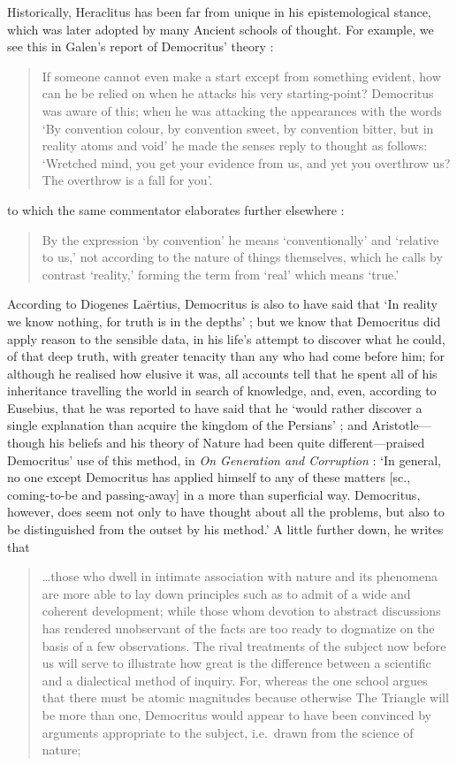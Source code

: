 Historically, Heraclitus has been far from unique in his epistemological stance, which was later adopted by many Ancient schools of thought. For example, we see this in Galen's report of Democritus' theory \cite{Taylor1999}:
\begin{quotation}
If someone cannot even make a start except from something evident, how can he be relied on when he attacks his very starting-point? Democritus was aware of this; when he was attacking the appearances with the words `By convention colour, by convention sweet, by convention bitter, but in reality atoms and void' he made the senses reply to thought as follows: `Wretched mind, you get your evidence from us, and yet you overthrow us? The overthrow is a fall for you'.
\end{quotation}
to which the same commentator elaborates further elsewhere \cite{Taylor1999}:
\begin{quote}
By the expression `by convention' he means `conventionally' and `relative to us,' not according to the nature of things themselves, which he calls by contrast `reality,' forming the term from `real' which means `true.'
\end{quote}
According to Diogenes La\"{e}rtius, Democritus is also to have said that `In reality we know nothing, for truth is in the depths' \cite{Taylor1999}; but we know that Democritus did apply reason to the sensible data, in his life's attempt to discover what he could, of that deep truth, with greater tenacity than any who had come before him; for although he realised how elusive it was, all accounts tell that he spent all of his inheritance travelling the world in search of knowledge, and, even, according to Eusebius, that he was reported to have said that he `would rather discover a single explanation than acquire the kingdom of the Persians' \cite{Taylor1999}; and Aristotle---though his beliefs and his theory of Nature had been quite different---praised Democritus' use of this method, in \textit{On Generation and Corruption} \cite{Aristotle1984}: `In general, no one except Democritus has applied himself to any of these matters [sc., coming-to-be and passing-away] in a more than superficial way. Democritus, however, does seem not only to have thought about all the problems, but also to be distinguished from the outset by his method.' A little further down, he writes that 
\begin{quotation}
\ldots those who dwell in intimate association with nature and its phenomena are more able to lay down principles such as to admit of a wide and coherent development; while those whom devotion to abstract discussions has rendered unobservant of the facts are too ready to dogmatize on the basis of a few observations. The rival treatments of the subject now before us will serve to illustrate how great is the difference between a scientific and a dialectical method of inquiry. For, whereas the one school argues that there must be atomic magnitudes because otherwise The Triangle will be more than one, Democritus would appear to have been convinced by arguments appropriate to the subject, i.e.~drawn from the science of nature;
\end{quotation} 
